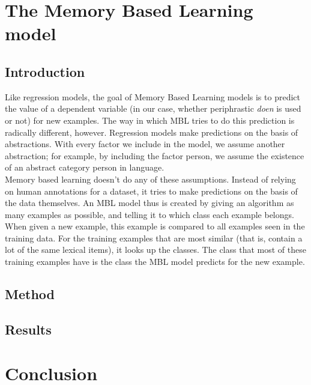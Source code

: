 \documentclass[12pt]{article}
\begin{document}
\section{The Memory Based Learning model} \label{mbl}

\subsection{Introduction}

Like regression models, the goal of Memory Based Learning models is to predict the value of a dependent variable (in our case, whether periphrastic \emph{doen} is used or not) for new examples. The way in which MBL tries to do this prediction is radically different, however. Regression models make predictions on the basis of abstractions. With every factor we include in the model, we assume another abstraction; for example, by including the factor person, we assume the existence of an abstract category person in language.\\\indent
Memory based learning doesn't do any of these assumptions. Instead of relying on human annotations for a dataset, it tries to make predictions on the basis of the data themselves. An MBL model thus is created by giving an algorithm as many examples as possible, and telling it to which class each example belongs. When given a new example, this example is compared to all examples seen in the training data. For the training examples that are most similar (that is, contain a lot of the same lexical items), it looks up the classes. The class that most of these training examples have is the class the MBL model predicts for the new example.

\subsection{Method}

\subsection{Results}











\section{Conclusion} \label{conc}
\end{document}
